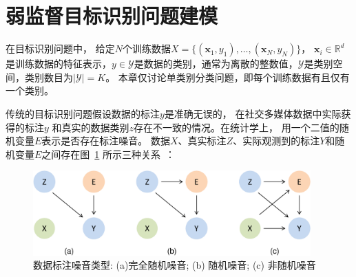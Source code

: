 \documentclass[doctor]{ustcthesis}
\def \x {\mathbf{x}}
\def \R {\mathbb{R}}
\def \Y {\mathcal{Y}}
\begin{document}
\section{弱监督目标识别问题建模}
在目标识别问题中， 给定$N$个训练数据$X=\{(\x_1, y_1), \ldots,
(\x_N, y_N)\}$， $\x_i \in \R^d$是训练数据的特征表示，$y \in
\Y$是数据的类别，通常为离散的整数值，$\Y$是类别空间，类别数目为$|\Y| = K$。
本章仅讨论单类别分类问题，即每个训练数据有且仅有一个类别。

传统的目标识别问题假设数据的标注$y$是准确无误的，
在社交多媒体数据中实际获得的标注$y$
和真实的数据类别$z$存在不一致的情况。在统计学上，
用一个二值的随机变量$E$表示是否存在标注噪音。
数据$X$、真实标注$Z$、实际观测到的标注$Y$和随机变量$E$之间存在图~\ref{fig:noise-taxonomy}
所示三种关系~\citep{frenay2014classification}：

\begin{figure}[t]
    \includegraphics[clip=true, width=0.95\textwidth]{noise-taxonomy.pdf}
    \caption{数据标注噪音类型: (a)完全随机噪音; (b) 随机噪音; (c) 非随机噪音}\label{fig:noise-taxonomy}
\end{figure}
\end{document}
